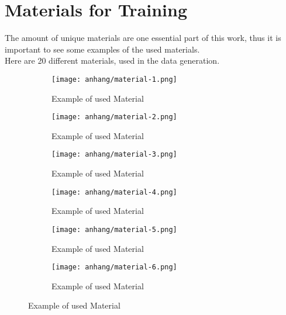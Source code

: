 \chapter{Materials for Training}
\label{appendix:materials-for-training}

	The amount of unique materials are one essential part of this work, thus it is important to see some examples of the used materials.\\
	Here are 20 different materials, used in the data generation.
	
	\begin{figure}[h]
		\centering
		\begin{subfigure}{0.45\textwidth}
			\centering
			\texttt{[image: anhang/material-1.png]}
			\caption[Example of used Material, created by \cite{Quixel}]{Example of used Material}
		\end{subfigure}
		\begin{subfigure}{0.45\textwidth}
			\centering
			\texttt{[image: anhang/material-2.png]}
			\caption[Example of used Material, created by \cite{Quixel}]{Example of used Material}
		\end{subfigure}
		
		\begin{subfigure}{0.45\textwidth}
			\centering
			\texttt{[image: anhang/material-3.png]}
			\caption[Example of used Material, created by \cite{Quixel}]{Example of used Material}
		\end{subfigure}
		\begin{subfigure}{0.45\textwidth}
			\centering
			\texttt{[image: anhang/material-4.png]}
			\caption[Example of used Material, created by \cite{Quixel}]{Example of used Material}
		\end{subfigure}
		
		\begin{subfigure}{0.45\textwidth}
			\centering
			\texttt{[image: anhang/material-5.png]}
			\caption[Example of used Material, created by \cite{Quixel}]{Example of used Material}
		\end{subfigure}
		\begin{subfigure}{0.45\textwidth}
			\centering
			\texttt{[image: anhang/material-6.png]}
			\caption[Example of used Material, created by \cite{Quixel}]{Example of used Material}
		\end{subfigure}
	\end{figure}
	

